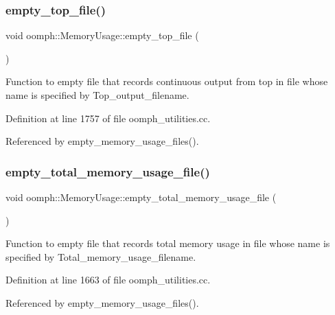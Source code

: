 \subsubsection{\texorpdfstring{empty\+\_\+top\+\_\+file()}{empty\_top\_file()}}
{\footnotesize\ttfamily void oomph\+::\+Memory\+Usage\+::empty\+\_\+top\+\_\+file (\begin{DoxyParamCaption}{ }\end{DoxyParamCaption})}



Function to empty file that records continuous output from top in file whose name is specified by Top\+\_\+output\+\_\+filename. 



Definition at line 1757 of file oomph\+\_\+utilities.\+cc.



Referenced by empty\+\_\+memory\+\_\+usage\+\_\+files().

\mbox{\label{namespaceoomph_1_1MemoryUsage_a8a0031773893f06aac876985e38940e4}} 
\subsubsection{\texorpdfstring{empty\+\_\+total\+\_\+memory\+\_\+usage\+\_\+file()}{empty\_total\_memory\_usage\_file()}}
{\footnotesize\ttfamily void oomph\+::\+Memory\+Usage\+::empty\+\_\+total\+\_\+memory\+\_\+usage\+\_\+file (\begin{DoxyParamCaption}{ }\end{DoxyParamCaption})}



Function to empty file that records total memory usage in file whose name is specified by Total\+\_\+memory\+\_\+usage\+\_\+filename. 



Definition at line 1663 of file oomph\+\_\+utilities.\+cc.



Referenced by empty\+\_\+memory\+\_\+usage\+\_\+files().

\mbox{\label{namespaceoomph_1_1MemoryUsage_a3426ed2144d50ce7a0941555b911c701}} 
